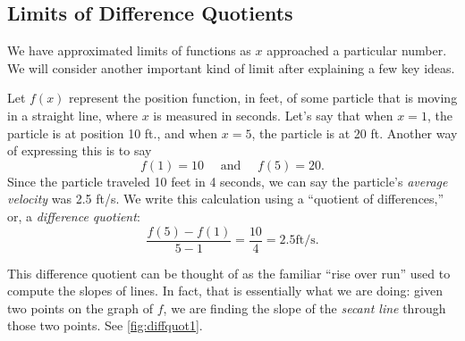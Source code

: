 \subsection*{Limits of Difference Quotients}


We have approximated limits of functions as $x$ approached a particular number. We will consider another important kind of limit after explaining a few key ideas.

Let $f(x)$ represent the position function, in feet, of some particle that is moving in a straight line, where $x$ is measured in seconds. Let's say that when $x=1$, the particle is at position 10 ft., and when $x=5$, the particle is at 20 ft. Another way of expressing this is to say $$f(1)=10 \quad \text{ and } \quad f(5) = 20.$$
Since the particle traveled 10 feet in 4 seconds, we can say the particle's \textit{average velocity} was 2.5 ft/s. We write this calculation using a ``quotient of differences,'' or, a \textit{difference quotient}: $$\frac{f(5) - f(1)}{5-1} = \frac{10}4 = 2.5 \text{ft/s}.$$

This difference quotient can be thought of as the familiar ``rise over run'' used to compute the slopes of lines. In fact, that is essentially what we are doing: given two points on the graph of $f$, we are finding the slope of the \textit{secant line} through those two points. See \autoref{fig:diffquot1}.

